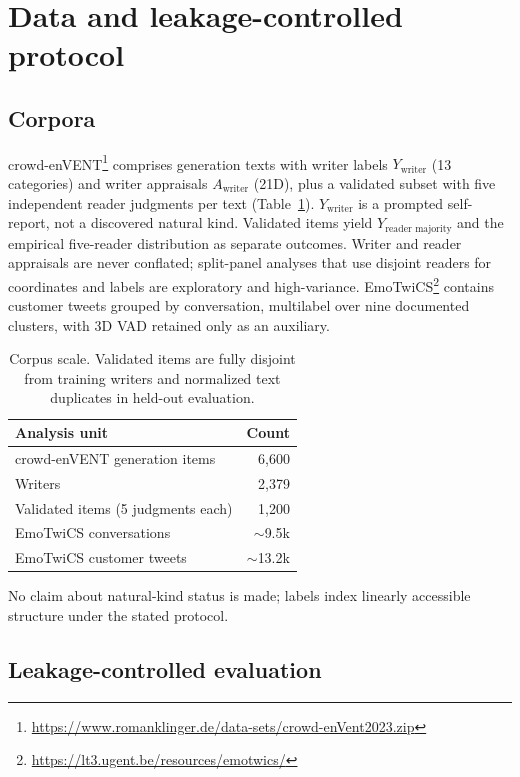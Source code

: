 \documentclass[11pt]{article}
\begin{document}
\section{Data and leakage-controlled protocol}
\label{sec:protocol}

\subsection{Corpora}

crowd-enVENT\footnote{\url{https://www.romanklinger.de/data-sets/crowd-enVent2023.zip}} comprises generation texts with writer labels $Y_{\mathrm{writer}}$ (13 categories) and writer appraisals $A_{\mathrm{writer}}$ (21D), plus a validated subset with five independent reader judgments per text (Table~\ref{tab:audit}). $Y_{\mathrm{writer}}$ is a prompted self-report, not a discovered natural kind. Validated items yield $Y_{\text{reader majority}}$ and the empirical five-reader distribution as separate outcomes. Writer and reader appraisals are never conflated; split-panel analyses that use disjoint readers for coordinates and labels are exploratory and high-variance. EmoTwiCS\footnote{\url{https://lt3.ugent.be/resources/emotwics/}} contains customer tweets grouped by conversation, multilabel over nine documented clusters, with 3D VAD retained only as an auxiliary.

\begin{table}[h]
\centering\small
\begin{tabular}{lr}
\toprule
Analysis unit & Count \\
\midrule
crowd-enVENT generation items & 6,600 \\
Writers & 2,379 \\
Validated items (5 judgments each) & 1,200 \\
EmoTwiCS conversations & $\sim$9.5k \\
EmoTwiCS customer tweets & $\sim$13.2k \\
\bottomrule
\end{tabular}
\caption{Corpus scale. Validated items are fully disjoint from training writers and normalized text duplicates in held-out evaluation.}
\label{tab:audit}
\end{table}

No claim about natural-kind status is made; labels index linearly accessible structure under the stated protocol.

\subsection{Leakage-controlled evaluation}
\end{document}

